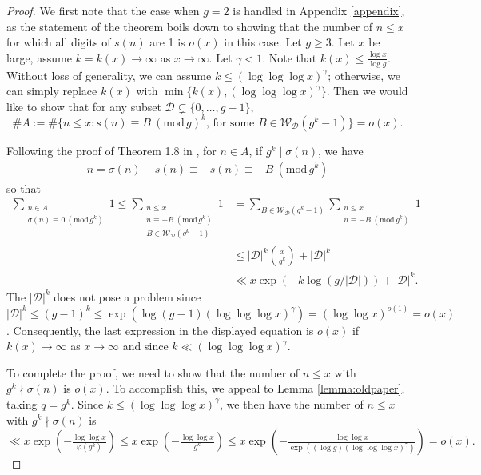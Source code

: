 \documentclass[11pt, reqno]{amsart}
\theoremstyle{remark}
\numberwithin{theorem}{section}
\numberwithin{proposition}{section}
\numberwithin{lemma}{section}
\numberwithin{corollary}{section}
\numberwithin{equation}{section}
\numberwithin{conjecture}{section}
\numberwithin{definition}{section}
\renewcommand{\bmod}[1]{\ ( \mathrm{mod} \, #1 )}
\begin{document}
\begin{proof}

We first note that the case when $g=2$ is handled in Appendix \ref{appendix}, as the statement of the theorem boils down to showing that the number of $n\leq x$ for which all digits of $s(n)$ are 1 is $o(x)$ in this case.  Let $g\geq 3$. Let $x$ be large, assume $k=k(x)\to \infty$ as $x\to \infty$. Let $\gamma<1$. Note that $k(x)\le \frac{\log x}{\log g}$. Without loss of generality, we can assume $k\leq (\log \log\log x)^\gamma$; otherwise, we can simply replace $k(x)$ with $\min\{k(x),(\log\log\log x)^\gamma\}$. Then we would like to show that 
    for any subset 
    $\mathcal{D}\subsetneq\{ 0,\ldots, g-1\}$, 
	$$\#A:=\#\{n\leq x: s(n)\equiv B\bmod {g}^k, \, \text{for some $B\in \mathcal{W}_{\mathcal{D}}(g^{k}-1)$}\}=o(x).$$ 
	
    
    Following the proof of Theorem 1.8 in \cite{bcddt}, for $n\in A$, if  $g^k\mid \sigma(n)$, we have 
	\begin{align*} 
		n= \sigma(n)-s(n) \equiv -s(n) \equiv -B\bmod{g^k}
	\end{align*}
	so that 
	\begin{align*}
	 \sum_{\substack{n\in A \\ \sigma(n)\equiv 0\bmod{g^k}}} 1  \leq \sum_{\substack{n\leq x\\ n\equiv -B\bmod{g^k} \\ B\in \mathcal{W}_{ \mathcal{D}}(g^{k}-1)}} 1 &= \sum_{B\in \mathcal{W}_{ \mathcal{D}}(g^{k}-1)} \sum_{\substack{n\leq x\\ n\equiv -B\bmod{g^k}}} 1 \\ &\leq |\mathcal{D}|^k \left(\frac{x}{g^k}\right)+|\mathcal{D}|^k \\ &\ll x  \exp \left( -k \log \left(g/|\mathcal{D}|\right)\right) +|\mathcal{D}|^k.
	\end{align*}
	The $|\mathcal{D}|^k$ does not pose a problem since $|\mathcal{D}|^k \leq (g-1)^k \leq \exp(\log(g-1) (\log \log \log x)^\gamma) = (\log \log x)^{o(1)} = o(x)$. Consequently, the last expression in the displayed equation is $o(x)$ if $k(x)\to \infty$ as $x\to \infty$ and since $k\ll (\log\log\log x)^\gamma$. 
    
    To complete the proof, we need to show that the number of $n\leq x$  with $g^k \nmid \sigma (n)$ is $o(x).$ To accomplish this, we appeal to Lemma \ref{lemma:oldpaper}, taking $q = g^k$. Since  $k\leq (\log\log\log x)^\gamma$, we then have  the number of $n\leq x$  with $g^k \nmid \sigma (n)$ is $\ll x\exp\left(-\frac{\log\log x}{\varphi(g^k)}\right)\leq  x\exp\left(-\frac{\log\log x}{g^k}\right)\leq x\exp\left(-\frac{\log\log x}{\exp((\log g) (\log \log \log x)^\gamma)}\right)=o(x).$ 
    

	
        
\end{proof}	
\end{document}
